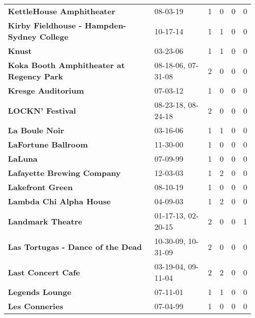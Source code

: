 \begin{supertabular}{p{0.4\textwidth}p{0.3\textwidth}p{0.05\textwidth}p{0.05\textwidth}p{0.05\textwidth}p{0.05\textwidth}}
                                    \textbf{KettleHouse Amphitheater} &            08-03-19 &  1 &  0 &  0 &  0 \\
                   \textbf{Kirby Fieldhouse - Hampden-Sydney College} &            10-17-14 &  1 &  1 &  0 &  0 \\
                                                       \textbf{Knust} &            03-23-06 &  1 &  1 &  0 &  0 \\
                     \textbf{Koka Booth Amphitheater at Regency Park} &  08-18-06, 07-31-08 &  2 &  0 &  0 &  0 \\
                                           \textbf{Kresge Auditorium} &            07-03-12 &  1 &  0 &  0 &  0 \\
                                             \textbf{LOCKN' Festival} &  08-23-18, 08-24-18 &  2 &  0 &  0 &  0 \\
                                               \textbf{La Boule Noir} &            03-16-06 &  1 &  1 &  0 &  0 \\
                                          \textbf{LaFortune Ballroom} &            11-30-00 &  1 &  0 &  0 &  0 \\
                                                      \textbf{LaLuna} &            07-09-99 &  1 &  0 &  0 &  0 \\
                                   \textbf{Lafayette Brewing Company} &            12-03-03 &  1 &  2 &  0 &  0 \\
                                             \textbf{Lakefront Green} &            08-10-19 &  1 &  0 &  0 &  0 \\
                                      \textbf{Lambda Chi Alpha House} &            04-09-03 &  1 &  2 &  0 &  0 \\
                                            \textbf{Landmark Theatre} &  01-17-13, 02-20-15 &  2 &  0 &  0 &  1 \\
                            \textbf{Las Tortugas - Dance of the Dead} &  10-30-09, 10-31-09 &  2 &  0 &  0 &  0 \\
                                           \textbf{Last Concert Cafe} &  03-19-04, 09-11-04 &  2 &  2 &  0 &  0 \\
                                              \textbf{Legends Lounge} &            07-11-01 &  1 &  1 &  0 &  0 \\
                                               \textbf{Les Conneries} &            07-04-99 &  1 &  0 &  0 &  0 \\

\end{supertabular}
